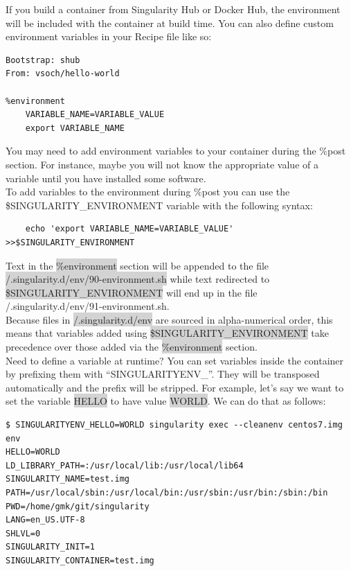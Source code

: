 \documentclass[a4paper]{article}
\begin{document}
If you build a container from Singularity Hub or Docker Hub, the environment will be included with the container at build time. You can also define custom environment variables in your Recipe file like so:

\begin{lstlisting}[frame=single]  
Bootstrap: shub
From: vsoch/hello-world

%environment
    VARIABLE_NAME=VARIABLE_VALUE
    export VARIABLE_NAME
\end{lstlisting}

You may need to add environment variables to your container during the \%post section. For instance, maybe you will not know the appropriate value of a variable until you have installed some software.\\[0.1in]

To add variables to the environment during \%post you can use the \$SINGULARITY\_ENVIRONMENT variable with the following syntax:

\begin{lstlisting}[frame=single]  
%post
    echo 'export VARIABLE_NAME=VARIABLE_VALUE' >>$SINGULARITY_ENVIRONMENT
\end{lstlisting}

Text in the \colorbox{lightgray}{\%environment} section will be appended to the file\colorbox{lightgray}{ /.singularity.d/env/90-environment.sh} while text redirected to \colorbox{lightgray}{\$SINGULARITY\_ENVIRONMENT} will end up in the file /.singularity.d/env/91-environment.sh.\\[0.1in]

Because files in \colorbox{lightgray}{/.singularity.d/env} are sourced in alpha-numerical order, this means that variables added using \colorbox{lightgray}{\$SINGULARITY\_ENVIRONMENT} take precedence over those added via the \colorbox{lightgray}{\%environment} section.\\[0.1in]

Need to define a variable at runtime? You can set variables inside the container by prefixing them with “SINGULARITYENV\_”. They will be transposed automatically and the prefix will be stripped. For example, let’s say we want to set the variable \colorbox{lightgray}{HELLO} to have value \colorbox{lightgray}{WORLD}. We can do that as follows:

\begin{lstlisting}[frame=single] 
$ SINGULARITYENV_HELLO=WORLD singularity exec --cleanenv centos7.img env
HELLO=WORLD
LD_LIBRARY_PATH=:/usr/local/lib:/usr/local/lib64
SINGULARITY_NAME=test.img
PATH=/usr/local/sbin:/usr/local/bin:/usr/sbin:/usr/bin:/sbin:/bin
PWD=/home/gmk/git/singularity
LANG=en_US.UTF-8
SHLVL=0
SINGULARITY_INIT=1
SINGULARITY_CONTAINER=test.img 
\end{lstlisting}
\end{document}
